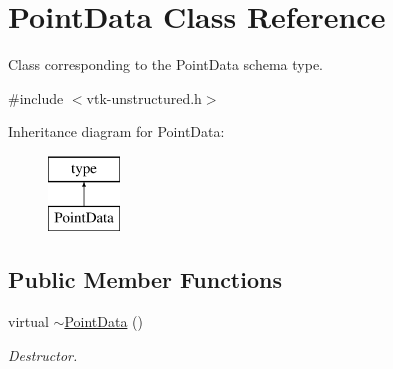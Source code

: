 \hypertarget{classPointData}{\section{Point\+Data Class Reference}
\label{classPointData}
}


Class corresponding to the Point\+Data schema type.  




{\ttfamily \#include $<$vtk-\/unstructured.\+h$>$}

Inheritance diagram for Point\+Data\+:\begin{figure}[H]
\begin{center}
\leavevmode
\includegraphics[height=2.000000cm]{classPointData}
\end{center}
\end{figure}
\subsection*{Public Member Functions}
\begin{DoxyCompactItemize}
\item 
virtual \hyperlink{classPointData_a53f701fd5abdb6105900c13f8282305e}{$\sim$\+Point\+Data} ()
\begin{DoxyCompactList}\small\item\em Destructor. \end{DoxyCompactList}\end{DoxyCompactItemize}
